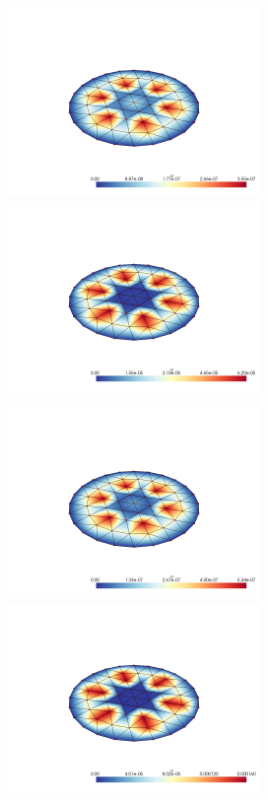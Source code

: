 \documentclass[
  11pt,
]{article}
\let\origfigure\figure
\let\endorigfigure\endfigure
\renewenvironment{figure}[1][2] {
    \expandafter\origfigure\expandafter[H]
} {
    \endorigfigure
}
\begin{document}
\includegraphics[width=0.5\textwidth,height=\textheight]{../img/mesh1-gauss02-L2.png}
\includegraphics[width=0.5\textwidth,height=\textheight]{../img/mesh1-gauss02-H1.png}

\begin{figure}
\caption{Finite element error in the L2 and H1 norms/seminorms, respectively for problem 1 over mesh number 1 using order 2 quadrature.}
\end{figure}

\includegraphics[width=0.5\textwidth,height=\textheight]{../img/mesh1-gauss05-L2.png}
\includegraphics[width=0.5\textwidth,height=\textheight]{../img/mesh1-gauss05-H1.png}
\end{document}
